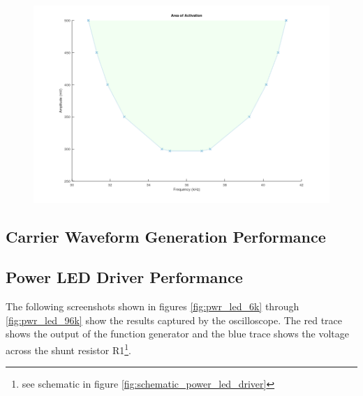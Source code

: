\begin{figure}[H]
	\centering
	\includegraphics[width=.8\textwidth]{figures/results/goertzel_amplitude_frequency_pairs.png}
	\label{fig:goertzel_amplitude_frequency_pairs}
\end{figure}


\subsection{Carrier Waveform Generation Performance}



\subsection{Power LED Driver Performance}

The following screenshots shown in figures \ref{fig:pwr_led_6k} through \ref{fig:pwr_led_96k} show the results captured by the oscilloscope. The red trace shows the output of the function generator and the blue trace shows the voltage across the shunt resistor R1\footnote{see schematic in figure \ref{fig:schematic_power_led_driver}}.

